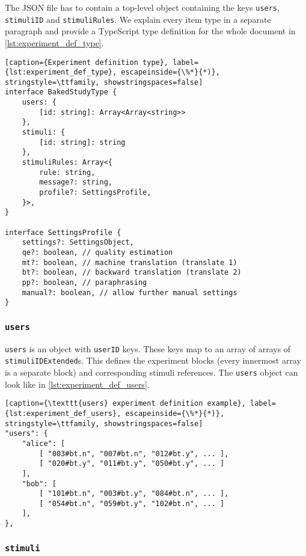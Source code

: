 The JSON file has to contain a top-level object containing the keys \texttt{users}, \texttt{stimuliID} and \texttt{stimuliRules}. We explain every item type in a separate paragraph and provide a TypeScript type definition for the whole document in \cref{lst:experiment_def_type}.

\begin{lstlisting}[caption={Experiment definition type}, label={lst:experiment_def_type}, escapeinside={\%*}{*)}, stringstyle=\ttfamily, showstringspaces=false]
interface BakedStudyType {
    users: {
        [id: string]: Array<Array<string>>
    },
    stimuli: {
        [id: string]: string
    },
    stimuliRules: Array<{
        rule: string,
        message?: string,
        profile?: SettingsProfile,
    }>,
}

interface SettingsProfile {
    settings?: SettingsObject,
    qe?: boolean, // quality estimation
    mt?: boolean, // machine translation (translate 1)
    bt?: boolean, // backward translation (translate 2)
    pp?: boolean, // paraphrasing
    manual?: boolean, // allow further manual settings
}
\end{lstlisting}

\subsubsection*{\texttt{users}}

\texttt{users} is an object with \texttt{userID} keys. These keys map to an array of arrays of \texttt{stimuliIDExtended}s. This defines the experiment blocks (every innermost array is a separate block) and corresponding stimuli references. The \texttt{users} object can look like in \cref{lst:experiment_def_users}.

\begin{lstlisting}[caption={\texttt{users} experiment definition example}, label={lst:experiment_def_users}, escapeinside={\%*}{*)}, stringstyle=\ttfamily, showstringspaces=false]
"users": {
    "alice": [
        [ "003#bt.n", "007#bt.n", "012#bt.y", ... ],
        [ "020#bt.y", "011#bt.y", "050#bt.y", ... ]
    ],
    "bob": [
        [ "101#bt.n", "003#bt.y", "084#bt.n", ... ],
        [ "054#bt.n", "059#bt.y", "102#bt.n", ... ]
    ],
},
\end{lstlisting}

\subsubsection*{\texttt{stimuli}}


